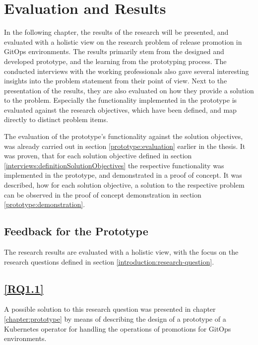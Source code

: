 \chapter{Evaluation and Results}
\label{evaluation-and-results}

In the following chapter,
the results of the research will be presented,
and evaluated with a holistic view on the research problem of release promotion in GitOps environments.
The results primarily stem from the designed and developed prototype,
and the learning from the prototyping process.
The conducted interviews with the working professionals also gave several interesting insights into
the problem statement from their point of view.
Next to the presentation of the results, they are also evaluated on how they provide a solution
to the problem.
Especially the functionality implemented in the prototype is evaluated against the research objectives,
which have been defined, and map directly to distinct problem items.

The evaluation of the prototype's functionality against the solution objectives,
was already carried out in section \ref{prototype:evaluation} earlier in the thesis.
It was proven, that for each solution objective defined in section \ref{interviews:definitionSolutionObjectives}
the respective functionality was implemented in the prototype,
and demonstrated in a proof of concept.
It was described, how for each solution objective,
a solution to the respective problem can be observed in the
proof of concept demonstration in section \ref{prototype:demonstration}.

\section*{Feedback for the Prototype}


The research results are evaluated with a holistic view,
with the focus on the research questions defined in section \ref{introduction:research-question}.

\section*{\ref{RQ1.1}}

A possible solution to this research question was presented in chapter
\ref{chapter:prototype}
by means of describing the design of a prototype
of a Kubernetes operator for handling the operations of promotions for GitOps environments.

